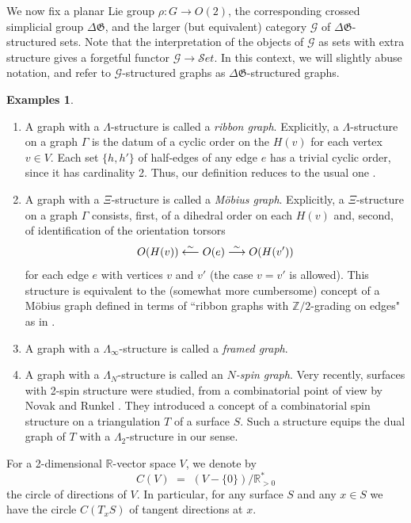 \documentclass[english,11pt,leqno]{article}
\def\RR{\mathbb{R}}
\def\ZZ{\mathbb{Z}}
\def\Gen{\mathfrak{G}}
\def\lra{\longrightarrow}
\def\lla{\longleftarrow}
\def\Set{ {\mathcal Set}}
\def\Set{ {\mathcal Set}}
\def\G{ {\mathcal G}}
\def\DG{ {\Delta \Gen}}
\theoremstyle{definition}
\newtheorem{exas}[thm]{Examples}
\theoremstyle{remark}
\numberwithin{equation}{section}
\begin{document}
We now fix a planar Lie group $\rho: G \to O(2)$, the corresponding crossed
simplicial group $\DG$, and the larger (but equivalent) category $\G$ of $\DG$-structured sets. 
Note that the interpretation of the objects of $\G$ as sets with
extra structure gives a forgetful functor $\G \to \Set$. In this context, we will slightly abuse
notation, and refer to $\G$-structured graphs as $\DG$-structured graphs.
   
\begin{exas}\label{defi:exggraphs}  
	\begin{enumerate}
		\item A graph with a $\Lambda$-structure is called a {\em ribbon graph}.
		Explicitly, a $\Lambda$-structure on a graph $\Gamma$ is the datum of a cyclic order
		on the $H(v)$ for each vertex $v\in V$. Each  set $\{h,h'\}$ of half-edges of any edge $e$
		has a trivial cyclic order, since it has cardinality 2. 
		Thus, our definition reduces to the usual one
		\cite{penner:book}. 
		
		\item A graph with a $\Xi$-structure is called a {\em M\"obius graph}.
		Explicitly, a $\Xi$-structure on a graph $\Gamma$  consists,
		first, of a dihedral order on each $H(v)$ and, second, of identification
		of the orientation torsors 
		\[
		O(H(v))\buildrel\sim\over \lla O(e)\buildrel\sim\over \lra O(H(v'))
		\]
		for each edge $e$ with vertices
		$v$ and $v'$ (the case $v=v'$ is allowed).
		 This structure  
		is equivalent to the (somewhat more cumbersome)  concept of a M\"obius graph defined
		 in terms of ``ribbon graphs with  $\ZZ/2$-grading
		on edges" as in \cite{braun, mulase-waldron, mulase-yu}.  
								
		\item A graph with a $\Lambda_{\infty}$-structure is called a {\em framed graph}.
		\item A graph with a $\Lambda_N$-structure is called an {\em $N$-spin graph}.
		Very recently, surfaces with 2-spin structure were studied, from a combinatorial point of
		view by Novak and Runkel \cite{novak-runkel}. They introduced a concept of
		a combinatorial spin structure on a triangulation $T$ of a surface $S$. Such a structure
		equips the dual graph of $T$ with a $\Lambda_2$-structure in our sense. 
	\end{enumerate}
\end{exas}

For a 2-dimensional $\RR$-vector space $V$, we denote by
\[
C(V) \,\,=\,\, (V-\{0\})/\RR^*_{>0}
\]
the circle of directions of $V$. In particular, for any surface $S$ and any $x\in S$ we have the circle
$C(T_xS)$ of tangent directions at $x$.
\end{document}

